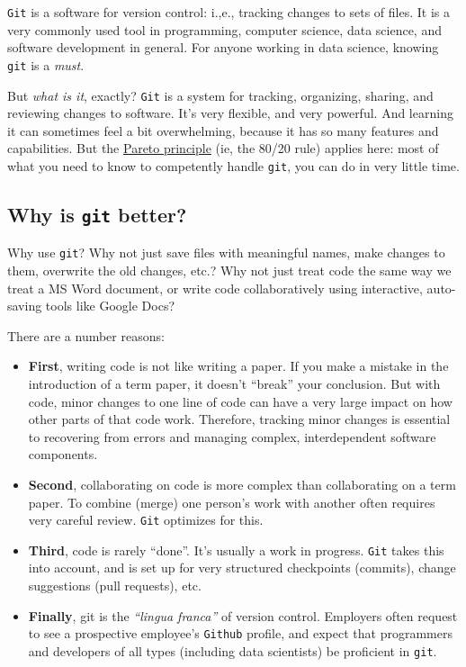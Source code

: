 \documentclass[
]{book}
\begin{document}
\texttt{Git} is a software for version control: i.,e., tracking changes to sets of files. It is a very commonly used tool in programming, computer science, data science, and software development in general. For anyone working in data science, knowing \texttt{git} is a \emph{must}.

But \emph{what is it}, exactly? \texttt{Git} is a system for tracking, organizing, sharing, and reviewing changes to software. It's very flexible, and very powerful. And learning it can sometimes feel a bit overwhelming, because it has so many features and capabilities. But the \href{https://en.wikipedia.org/wiki/Pareto_principle}{Pareto principle} (ie, the 80/20 rule) applies here: most of what you need to know to competently handle \texttt{git}, you can do in very little time.

\hypertarget{why-is-git-better}{%
\subsection*{\texorpdfstring{Why is \texttt{git} better?}{Why is git better?}}\label{why-is-git-better}}

Why use \texttt{git}? Why not just save files with meaningful names, make changes to them, overwrite the old changes, etc.? Why not just treat code the same way we treat a MS Word document, or write code collaboratively using interactive, auto-saving tools like Google Docs?

There are a number reasons:

\begin{itemize}
\item
  \textbf{First}, writing code is not like writing a paper. If you make a mistake in the introduction of a term paper, it doesn't ``break'' your conclusion. But with code, minor changes to one line of code can have a very large impact on how other parts of that code work. Therefore, tracking minor changes is essential to recovering from errors and managing complex, interdependent software components.
\item
  \textbf{Second}, collaborating on code is more complex than collaborating on a term paper. To combine (merge) one person's work with another often requires very careful review. \texttt{Git} optimizes for this.
\item
  \textbf{Third}, code is rarely ``done''. It's usually a work in progress. \texttt{Git} takes this into account, and is set up for very structured checkpoints (commits), change suggestions (pull requests), etc.
\item
  \textbf{Finally}, git is the \emph{``lingua franca''} of version control. Employers often request to see a prospective employee's \texttt{Github} profile, and expect that programmers and developers of all types (including data scientists) be proficient in \texttt{git}.
\end{itemize}
\end{document}
